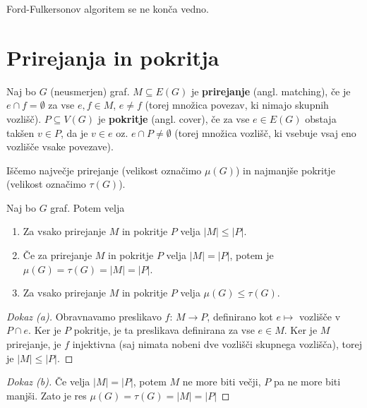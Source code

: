 \documentclass[11pt, a4paper]{article}
\begin{document}
    \begin{remark}
        Ford-Fulkersonov algoritem se ne konča vedno.
    \end{remark}



    \pagebreak
    \section{Prirejanja in pokritja}

    \begin{definition}
        Naj bo \(G\) (neusmerjen) graf. \(M \subseteq E(G)\) je \textbf{prirejanje} (angl. matching), če je \(e \cap f = \emptyset\) za vse \(e,f \in M\), \(e \neq f\) (torej množica povezav, ki nimajo skupnih vozlišč). \(P \subseteq V(G)\) je \textbf{pokritje} (angl. cover), če za vse \(e \in E(G)\) obstaja takšen \(v \in P\), da je \(v \in e\) oz. \(e \cap P \neq \emptyset\) (torej množica vozlišč, ki vsebuje vsaj eno vozlišče vsake povezave).
    \end{definition}

    Iščemo največje prirejanje (velikost označimo \(\mu(G)\)) in najmanjše pokritje (velikost označimo \(\tau(G)\)).

    \begin{proposition}
        Naj bo \(G\) graf. Potem velja
        \begin{enumerate}[label=(\alph*)]
            \item Za vsako prirejanje \(M\) in pokritje \(P\) velja \(|M| \le |P|\).
            \item Če za prirejanje \(M\) in pokritje \(P\) velja \(|M|=|P|\), potem je \(\mu(G) = \tau(G) = |M| = |P|\).
            \item Za vsako prirejanje \(M\) in pokritje \(P\) velja \(\mu(G) \le \tau(G)\).
        \end{enumerate}
    \end{proposition}

    \begin{proof}[Dokaz \emph{(a)}]
        Obravnavamo preslikavo \(f\): \(M \to P\), definirano kot \(e \mapsto\) vozlišče v \(P \cap e\). Ker je \(P\) pokritje, je ta preslikava definirana za vse \(e \in M\). Ker je \(M\) prirejanje, je \(f\) injektivna (saj nimata nobeni dve vozlišči skupnega vozlišča), torej je \(|M| \le |P|\).
    \end{proof}

    \begin{proof}[Dokaz \emph{(b)}]
        Če velja \(|M|=|P|\), potem \(M\) ne more biti večji, \(P\) pa ne more biti manjši. Zato je res \(\mu(G) = \tau(G) = |M| = |P|\)
    \end{proof}
\end{document}
